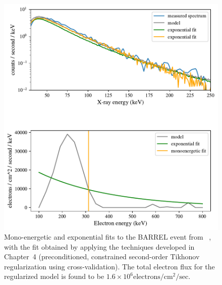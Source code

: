 \begin{figure}[p]
    \centering
    \includegraphics[width=1.0\textwidth]{figures/chapter_5/barrel_electron_fit_comparison/barrel_fit_comparison}
    \caption{Mono-energetic and exponential fits to the BARREL event from ~\cite{Halford2015}, with the fit obtained by applying the techniques developed in Chapter~4 (preconditioned, constrained second-order Tikhonov regularization using cross-validation). The total electron flux for the regularized model is found to be $1.6 \times 10^6 \mbox{electrons}/\mbox{cm}^2/\mbox{sec}$.}
    \label{barrel_electron_fit_comparison}
\end{figure}

